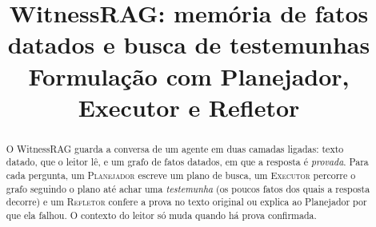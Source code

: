 \documentclass[10pt,twocolumn]{article}
\title{\vspace{-8mm}\textbf{WitnessRAG: memória de fatos datados e busca de testemunhas}\\[2pt]
\large Formulação com Planejador, Executor e Refletor}
\author{}
\date{\vspace{-10mm}}
\theoremstyle{definition}
\newcommand{\op}[1]{\textsc{#1}}
\begin{document}
\maketitle


\begin{abstract}\noindent
O WitnessRAG guarda a conversa de um agente em duas camadas ligadas: texto
datado, que o leitor lê, e um grafo de fatos datados, em que a resposta é
\emph{provada}. Para cada pergunta, um \op{Planejador} escreve um plano de
busca, um \op{Executor} percorre o grafo seguindo o plano até achar uma
\emph{testemunha} (os poucos fatos dos quais a resposta decorre) e um
\op{Refletor} confere a prova no texto original ou explica ao Planejador por
que ela falhou. O contexto do leitor só muda quando há prova confirmada.
\end{abstract}
\end{document}
